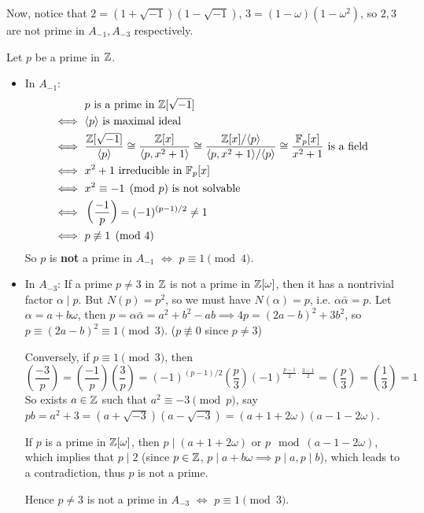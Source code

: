 Now, notice that $2 = (1 + \sqrt{-1})(1 - \sqrt{-1})$, $3 = (1 - \omega) (1 - \omega^2)$,
so $2, 3$ are not prime in $A_{-1}, A_{-3}$ respectively.

Let $p$ be a prime in $\mathbb{Z}$.
\begin{itemize}
  \item In $A_{-1}$:
    \begin{align*}
      & p \text{ is a prime in } \mathbb{Z}[\sqrt{-1}] \\
      \iff \ & \langle p\rangle \text{ is maximal ideal } \\
      \iff \ & \frac{\mathbb{Z}[\sqrt{-1}]}{\langle p\rangle} \cong \frac{\mathbb{Z}[x]}{\langle p, x^2+1\rangle}
      \cong \frac{\mathbb{Z}[x]/\langle p\rangle}{\langle p, x^2+1\rangle/\langle p\rangle} \cong \frac{\mathbb{F}_p[x]}{x^2+1}
      \text{ is a field } \\
      \iff \ & x^2 + 1 \text{ irreducible in } \mathbb{F}_p[x] \\
      \iff \ & x^2 \equiv -1 \pmod{p} \text{ is not solvable } \\
      \iff \ & \left(\frac{-1}{p}\right) = (-1)^{(p-1)/2} \neq 1 \\
      \iff \ & p \not\equiv 1 \pmod{4}
    \end{align*}
    So $p$ is {\bf not} a prime in $A_{-1}$ $\iff$ $p \equiv 1 \pmod{4}$.
  \item In $A_{-3}$: 
    If a prime $p \neq 3$ in $\mathbb{Z}$ is not a prime in $\mathbb{Z}[\omega]$, then it has
    a nontrivial factor $\alpha \mid p$. But $N(p) = p^2$, so 
    we must have $N(\alpha) = p$, i.e. $\alpha \bar{\alpha} = p$.
    Let $\alpha = a + b \omega$, then
    $p = \alpha \bar{\alpha} = a^2 + b^2 - ab \implies 4p = (2a - b)^2 + 3b^2$,
    so $p \equiv (2a - b)^2 \equiv 1 \pmod{3}$. ($p \not\equiv 0$ since $p \neq 3$)

    Conversely, if $p \equiv 1 \pmod{3}$, then
    \[ \left(\frac{-3}{p}\right)
      = \left(\frac{-1}{p}\right) \left(\frac{3}{p}\right)
      = (-1)^{(p-1)/2} \left(\frac{p}{3}\right) (-1)^{\frac{p-1}{2} \cdot \frac{3-1}{2}}
      = \left(\frac{p}{3}\right) = \left(\frac{1}{3}\right) = 1 \]
    So exists $a \in \mathbb{Z}$ such that $a^2 \equiv -3 \pmod{p}$,
    say $pb = a^2 + 3 = (a + \sqrt{-3}) (a - \sqrt{-3}) = (a+1 + 2\omega) (a - 1 - 2\omega)$.

    If $p$ is a prime in $\mathbb{Z}[\omega]$, then $p \mid (a+1+2\omega)$ or $p \mod (a - 1 - 2\omega)$,
    which implies that $p \mid 2$ (since $p \in \mathbb{Z}$, $p \mid a + b\omega \implies p \mid a, p \mid b$), 
    which leads to a contradiction, thus $p$ is not a prime.

    Hence $p \neq 3$ is not a prime in $A_{-3}$ $\iff$ $p \equiv 1 \pmod{3}$.
\end{itemize}


